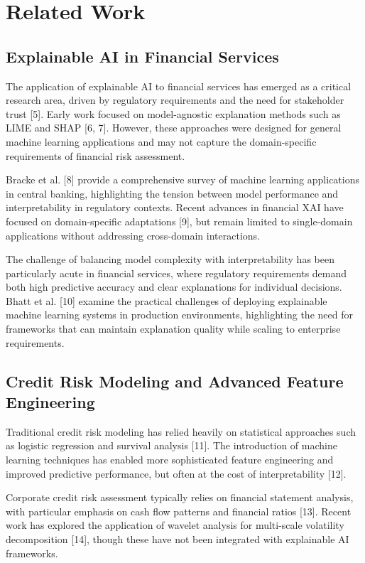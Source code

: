 \documentclass[a4 paper, 11pt,twoside]{article}
\newcommand{\0}{\Bf{0}}
\theoremstyle{definition}
\begin{document}
\section{Related Work}

\subsection{Explainable AI in Financial Services}

The application of explainable AI to financial services has emerged as a critical research area, driven by regulatory requirements and the need for stakeholder trust [5]. Early work focused on model-agnostic explanation methods such as LIME and SHAP [6, 7]. However, these approaches were designed for general machine learning applications and may not capture the domain-specific requirements of financial risk assessment.

Bracke et al. [8] provide a comprehensive survey of machine learning applications in central banking, highlighting the tension between model performance and interpretability in regulatory contexts. Recent advances in financial XAI have focused on domain-specific adaptations [9], but remain limited to single-domain applications without addressing cross-domain interactions.

The challenge of balancing model complexity with interpretability has been particularly acute in financial services, where regulatory requirements demand both high predictive accuracy and clear explanations for individual decisions. Bhatt et al. [10] examine the practical challenges of deploying explainable machine learning systems in production environments, highlighting the need for frameworks that can maintain explanation quality while scaling to enterprise requirements.

\subsection{Credit Risk Modeling and Advanced Feature Engineering}

Traditional credit risk modeling has relied heavily on statistical approaches such as logistic regression and survival analysis [11]. The introduction of machine learning techniques has enabled more sophisticated feature engineering and improved predictive performance, but often at the cost of interpretability [12].

Corporate credit risk assessment typically relies on financial statement analysis, with particular emphasis on cash flow patterns and financial ratios [13]. Recent work has explored the application of wavelet analysis for multi-scale volatility decomposition [14], though these have not been integrated with explainable AI frameworks.
\end{document}
